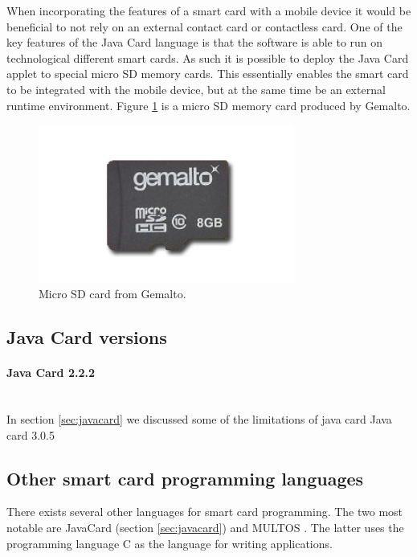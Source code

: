 When incorporating the features of a smart card with a mobile device it would be beneficial to not rely on an external contact card or contactless card. One of the key features of the Java Card language is that the software is able to run on technological different smart cards. As such it is possible to deploy the Java Card applet to special micro SD memory cards. This essentially enables the smart card to be integrated with the mobile device, but at the same time be an external runtime environment. Figure \ref{fig:msdcard} is a micro SD memory card produced by Gemalto.

\begin{figure}[h!]
  \caption{Micro SD card from Gemalto.}
  \label{fig:msdcard}
  \centering
    \includegraphics[width=0.75\textwidth]{images/msd.png}
\end{figure}

\subsection{Java Card versions}
\paragraph{Java Card 2.2.2}\mbox{}\\
In section \ref{sec:javacard} we discussed some of the limitations of java card
Java card 3.0.5 %



\subsection{Other smart card programming languages}
There exists several other languages for smart card programming. The two most notable are JavaCard (section \ref{sec:javacard}) and MULTOS \cite{multos}. The latter uses the programming language C as the language for writing applications.

